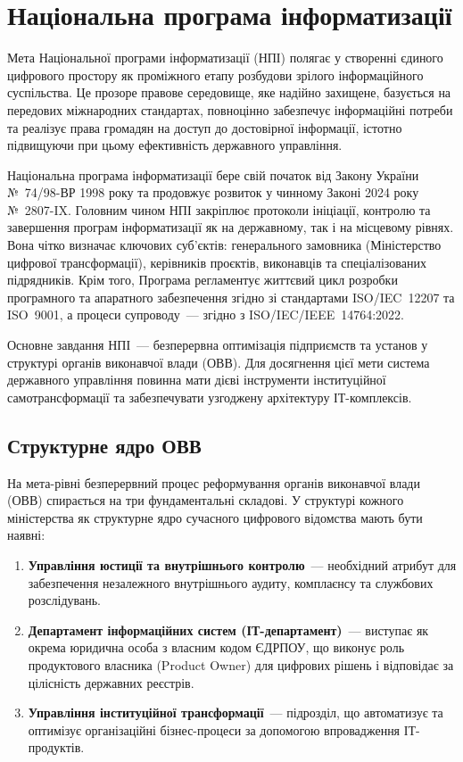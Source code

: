 \chapter{Національна програма інформатизації}

Мета Національної програми інформатизації (НПІ) полягає у створенні єдиного цифрового простору як проміжного етапу розбудови зрілого інформаційного суспільства. Це прозоре правове середовище, яке надійно захищене, базується на передових міжнародних стандартах, повноцінно забезпечує інформаційні потреби та реалізує права громадян на доступ до достовірної інформації, істотно підвищуючи при цьому ефективність державного управління.

Національна програма інформатизації бере свій початок від Закону України №~74/98-ВР 1998 року та продовжує розвиток у чинному Законі 2024 року №~2807-IX. Головним чином НПІ закріплює протоколи ініціації, контролю та завершення програм інформатизації як на державному, так і на місцевому рівнях. Вона чітко визначає ключових суб'єктів: генерального замовника (Міністерство цифрової трансформації), керівників проєктів, виконавців та спеціалізованих підрядників. Крім того, Програма регламентує життєвий цикл розробки програмного та апаратного забезпечення згідно зі стандартами ISO/IEC~12207 та ISO~9001, а процеси супроводу~--- згідно з ISO/IEC/IEEE~14764:2022.

Основне завдання НПІ~--- безперервна оптимізація підприємств та установ у структурі органів виконавчої влади (ОВВ). Для досягнення цієї мети система державного управління повинна мати дієві інструменти інституційної самотрансформації та забезпечувати узгоджену архітектуру ІТ-комплексів.

\section{Структурне ядро ОВВ}

На мета-рівні безперервний процес реформування органів виконавчої влади (ОВВ) спирається на три фундаментальні складові. У структурі кожного міністерства як структурне ядро сучасного цифрового відомства мають бути наявні:

\begin{enumerate}
    \item \textbf{Управління юстиції та внутрішнього контролю}~--- необхідний атрибут для забезпечення незалежного внутрішнього аудиту, комплаєнсу та службових розслідувань.
    \item \textbf{Департамент інформаційних систем (ІТ-департамент)}~--- виступає як окрема юридична особа з власним кодом ЄДРПОУ, що виконує роль продуктового власника (Product Owner) для цифрових рішень і відповідає за цілісність державних реєстрів.
    \item \textbf{Управління інституційної трансформації}~--- підрозділ, що автоматизує та оптимізує організаційні бізнес-процеси за допомогою впровадження ІТ-продуктів.
\end{enumerate}

